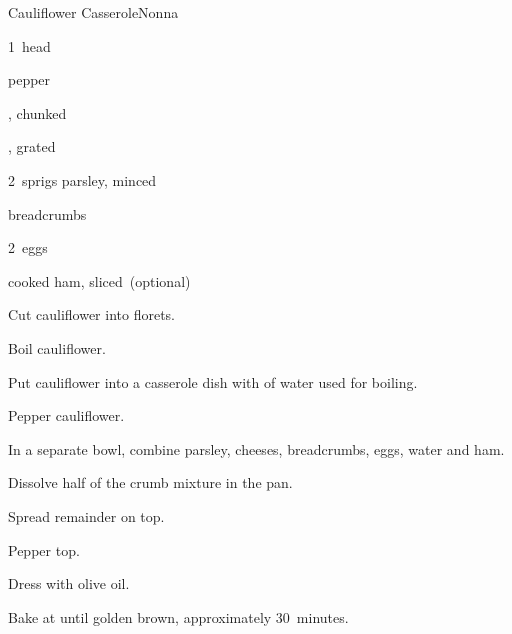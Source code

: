 \begin{recipe}{Cauliflower Casserole}{Nonna}{}

\begin{ingredients}
\item 1~head 
\item pepper
\item \C{\half} , chunked
\item \C{\half} , grated
\item 2~sprigs parsley, minced
\item \C{\threequarter} breadcrumbs
\item 2~eggs
\item \C{\quarter} cooked ham, sliced~(optional)
\end{ingredients}

\begin{directions}
\item Cut cauliflower into florets.
\item Boil cauliflower.
\item Put cauliflower into a casserole dish with  of water used for boiling.
\item Pepper cauliflower.
\item In a separate bowl, combine parsley, cheeses, breadcrumbs, eggs, \C{\quarter} water and ham.
\item Dissolve half of the crumb mixture in the pan.
\item Spread remainder on top.
\item Pepper top.
\item Dress with olive oil.
\item Bake at  until golden brown, approximately 30~minutes.
\end{directions}

\end{recipe}
